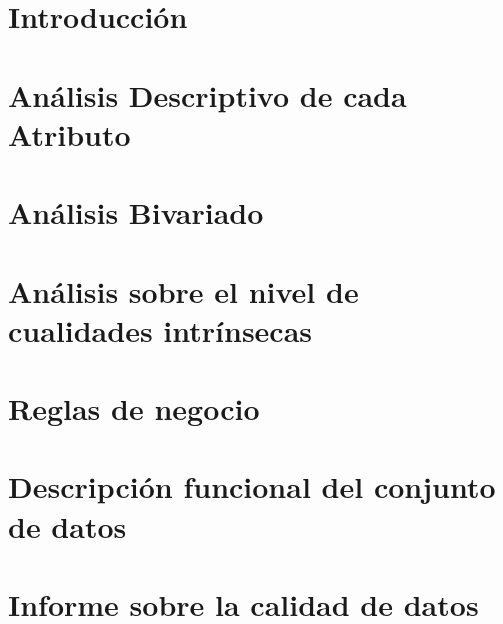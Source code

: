 \documentclass[a4paper]{article}
\begin{document}
\thispagestyle{empty}
\maketitle
\thispagestyle{empty}
\newpage

\tableofcontents

\newpage
\section{Introducción}


\section{Análisis Descriptivo de cada Atributo}


\newpage
\section{Análisis Bivariado}


\newpage
\section{Análisis sobre el nivel de cualidades intrínsecas}


\newpage
\section{Reglas de negocio}
%

\newpage
\section{Descripción funcional del conjunto de datos}
%

\newpage
\section{Informe sobre la calidad de datos}
%
\end{document}
